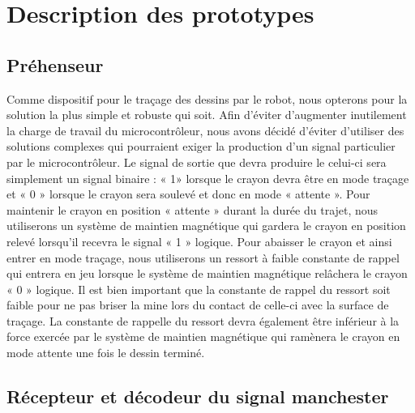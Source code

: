 


\chapter{Description des prototypes}
\label{s:prototypes}
\section{Préhenseur}

Comme dispositif pour le traçage des dessins par le robot, nous opterons pour la solution la plus simple et robuste qui soit. Afin d’éviter d’augmenter inutilement la charge de travail du microcontrôleur, nous avons décidé d’éviter d’utiliser des solutions complexes qui pourraient exiger la production d’un signal particulier par le microcontrôleur. Le signal de sortie que devra produire le celui-ci sera simplement un signal binaire : « 1» lorsque le crayon devra être en mode traçage et « 0 » lorsque le crayon sera soulevé et donc en mode « attente ». Pour maintenir le crayon en position « attente » durant la durée du trajet, nous utiliserons un système de maintien magnétique qui gardera le crayon en position relevé lorsqu’il recevra le signal « 1 » logique. Pour abaisser le crayon et ainsi entrer en mode traçage, nous utiliserons un ressort à faible constante de rappel qui entrera en jeu lorsque le système de maintien magnétique relâchera le crayon « 0 » logique. Il est bien important que la constante de rappel du ressort soit faible pour ne pas briser la mine lors du contact de celle-ci avec la surface de traçage. La constante de rappelle du ressort devra également être inférieur à la force exercée par le système de maintien magnétique qui ramènera le crayon en mode attente une fois le dessin terminé.

\section{ Récepteur et décodeur du signal manchester}

